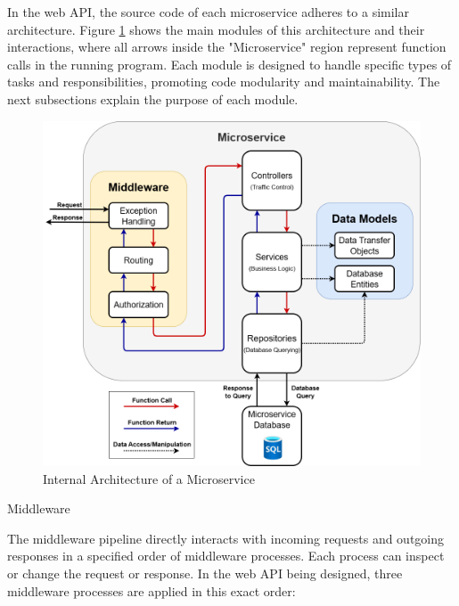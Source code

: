 \documentclass[12pt, reqno]{amsbook}
\makeatletter
\def\subsection{\@startsection{subsection}{2}%
      \z@{.5\linespacing\@plus.7\linespacing}{.25\linespacing}%
      {\normalfont\bfseries\flushleft}}
\theoremstyle{definition}
\theoremstyle{definition}
\numberwithin{section}{chapter}
\numberwithin{table}{chapter}
\numberwithin{figure}{chapter}
\makeatother
\begin{document}
In the web \ac{API}, the source code of each microservice adheres to a similar architecture. Figure \ref{Figure:InternalMicroserviceArchitecture} shows the main modules of this architecture and their interactions, where all arrows inside the "Microservice" region represent function calls in the running program. Each module is designed to handle specific types of tasks and responsibilities, promoting code modularity and maintainability. The next subsections explain the purpose of each module.

\begin{figure}[H]
  \centering
  \includegraphics[width=1\linewidth]{images/InternalMicroserviceArchitecture.png}
  \caption{\label{Figure:InternalMicroserviceArchitecture}Internal Architecture of a Microservice}
\end{figure}

\subsection{Middleware}
\label{Subsection:Middleware}

The middleware pipeline directly interacts with incoming requests and outgoing responses in a specified order of middleware processes. Each process can inspect or change the request or response. In the web \ac{API} being designed, three middleware processes are applied in this exact order:
\end{document}
